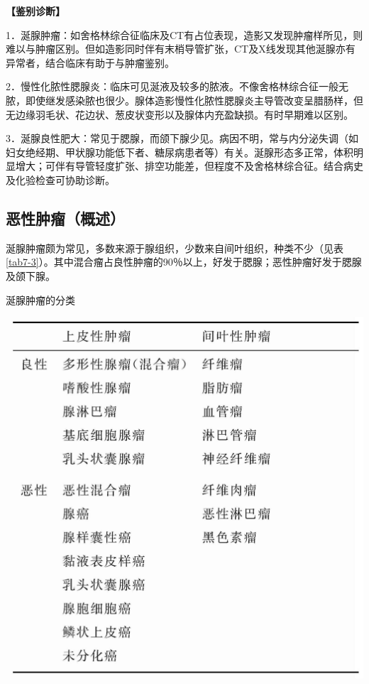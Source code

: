 \textbf{【鉴别诊断】}

1．涎腺肿瘤：如舍格林综合征临床及CT有占位表现，造影又发现肿瘤样所见，则难以与肿瘤区别。但如造影同时伴有末梢导管扩张，CT及X线发现其他涎腺亦有异常者，结合临床有助于与肿瘤鉴别。

2．慢性化脓性腮腺炎：临床可见涎液及较多的脓液。不像舍格林综合征一般无脓，即使继发感染脓也很少。腺体造影慢性化脓性腮腺炎主导管改变呈腊肠样，但无边缘羽毛状、花边状、葱皮状变形以及腺体内充盈缺损。有时早期难以区别。

3．涎腺良性肥大：常见于腮腺，而颌下腺少见。病因不明，常与内分泌失调（如妇女绝经期、甲状腺功能低下者、糖尿病患者等）有关。涎腺形态多正常，体积明显增大；可伴有导管轻度扩张、排空功能差，但程度不及舍格林综合征。结合病史及化验检查可协助诊断。

\subsection{恶性肿瘤（概述）}

涎腺肿瘤颇为常见，多数来源于腺组织，少数来自间叶组织，种类不少（见表\ref{tab7-3}）。其中混合瘤占良性肿瘤的90％以上，好发于腮腺；恶性肿瘤好发于腮腺及颌下腺。

\begin{table}[htbp]
\centering
\caption{涎腺肿瘤的分类}
\label{tab7-3}
\includegraphics[width=\textwidth,height=\textheight,keepaspectratio]{./images/Image00161.jpg}
\end{table}

